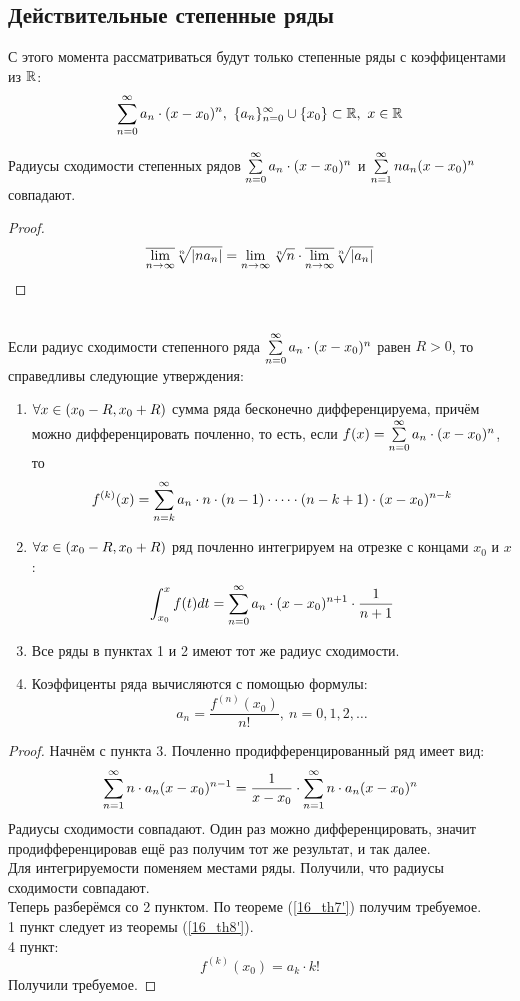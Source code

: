 \subsection{Действительные степенные ряды}
\begin{note}
	С этого момента рассматриваться будут только степенные ряды с коэффицентами из $\mathbb{R}$:
	\[\sss,\ \{a_n\}_{n=0}^\i\cup\{x_0\}\subset\R,\ x\in\R\]
\end{note}
\begin{lemma}
	Радиусы сходимости степенных рядов $\sss$ и $\ss na_n(x-x_0)^n$ совпадают.
\end{lemma}
\begin{proof}
	\[\v{\lim_{n\ra\i}}\sqrt[n]{|na_n|}=\lim_{n\ra\i}\sqrt[n]{n}\cdot\v{\lim_{n\ra\i}}\sqrt[n]{|a_n|}\]
\end{proof}
\begin{theorem}\label{17_th5}\\
	Если радиус сходимости степенного ряда $\sss$ равен $R>0$, то справедливы следующие утверждения:
	\begin{enumerate}
		\item $\forall x\in(x_0-R,x_0+R)$ сумма ряда бесконечно дифференцируема, причём можно дифференцировать почленно, то есть, если $f(x)=\sss$, то \[f^{(k)}(x)=\ss[k]a_n\cdot n\cdot (n-1)\cdot\dots\cdot(n-k+1)\cdot(x-x_0)^{n-k}\]
		\item $\forall x\in(x_0-R,x_0+R)$ ряд почленно интегрируем на отрезке с концами $x_0$ и $x$:
		\[\int_{x_0}^xf(t)dt=\ss[0] a_n\cdot(x-x_0)^{n+1}\cdot\frac1{n+1}\]
		\item Все ряды в пунктах 1 и 2 имеют тот же радиус сходимости.
		\item Коэффиценты ряда вычисляются с помощью формулы:
		\[a_n=\frac{f^{(n)}(x_0)}{n!},\ n=0,1,2,\dots\]
	\end{enumerate}
\end{theorem}
\begin{proof}
	Начнём с пункта 3. Почленно продифференцированный ряд имеет вид:
	\[\ss[1]n\cdot a_n(x-x_0)^{n-1}=\frac1{x-x_0}\cdot\ss[1]n\cdot a_n(x-x_0)^n\]
	Радиусы сходимости совпадают. Один раз можно дифференцировать, значит продифференцировав ещё раз получим тот же результат, и так далее.\\
	Для интегрируемости поменяем местами ряды. Получили, что радиусы сходимости совпадают.\\
	Теперь разберёмся со 2 пунктом. По теореме (\ref{16_th7'}) получим требуемое.\\
	1 пункт следует из теоремы (\ref{16_th8'}).\\
	4 пункт:
	\[f^{(k)}(x_0)=a_k\cdot k!\]
	Получили требуемое.
\end{proof}